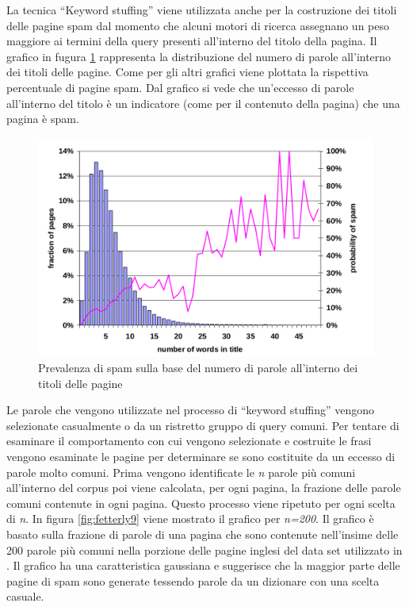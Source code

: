 La tecnica ``Keyword stuffing'' viene utilizzata anche per la costruzione dei titoli delle pagine spam dal momento che alcuni motori di ricerca assegnano un peso maggiore ai termini della query presenti all'interno del titolo della pagina. Il grafico in fugura \ref{fig:fetterly4} rappresenta la distribuzione del numero di parole all'interno dei titoli delle pagine. Come per gli altri grafici viene plottata la rispettiva percentuale di pagine spam. Dal grafico si vede che un'eccesso di parole all'interno del titolo è un indicatore (come per il contenuto della pagina) che una pagina è spam.
\begin{figure}[htbp]
\centering
\includegraphics[width=12cm]{immagini/fetterly/fetterly4}
\caption{Prevalenza di spam sulla base del numero di parole all'interno dei titoli delle pagine}
\label{fig:fetterly4}
\end{figure}
Le parole che vengono utilizzate nel processo di ``keyword stuffing'' vengono selezionate casualmente o da un ristretto gruppo di query comuni. Per tentare di esaminare il comportamento con cui vengono selezionate e costruite le frasi vengono esaminate le pagine per  determinare se sono costituite da un eccesso di parole molto comuni. Prima vengono identificate le \textit{n} parole più comuni all'interno del corpus poi viene calcolata, per ogni pagina, la frazione delle parole comuni contenute in ogni pagina. Questo processo viene ripetuto per ogni scelta di \textit{n}. In figura \ref{fig:fetterly9} viene mostrato il grafico per \textit{n=200}. Il grafico è basato sulla frazione di parole di una pagina che sono contenute nell'insime delle 200 parole più comuni nella porzione delle pagine inglesi del data set utilizzato in \cite{Ntoulas:2006:DSW:1135777.1135794}. Il grafico ha una caratteristica gaussiana e suggerisce che la maggior parte delle pagine di spam sono generate tessendo parole da un dizionare con una scelta casuale.
